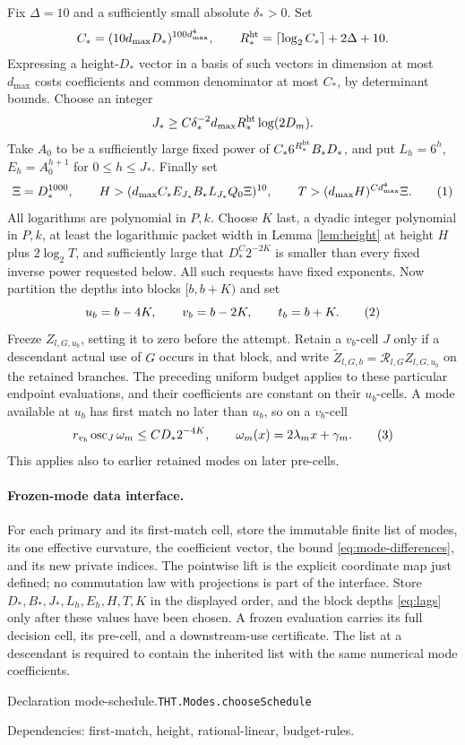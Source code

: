 \documentclass[11pt]{article}
\theoremstyle{definition}
\newcommand{\osc}{\operatorname{osc}}
\newcommand{\eqtag}[1]{\refstepcounter{equation}\tag{\theequation}\label{#1}}
\numberwithin{equation}{section}
\newcommand{\bp}[3]{\par\smallskip\begingroup\footnotesize
\noindent\hypertarget{bp:#1}{\textsf{Declaration #1.}}\quad\nolinkurl{#2}\par
\noindent\textsf{Dependencies:} #3.\par\endgroup\smallskip}
\begin{document}
Fix $\Delta=10$ and a sufficiently small absolute $\delta_*>0$. Set
\[
 C_*=(10d_{\max}D_*)^{100d_{\max}^4},\qquad
 R_*^{\rm ht}=\lceil\log_2C_*\rceil+2\Delta+10.
\]
Expressing a height-$D_*$ vector in a basis of such vectors in dimension at most $d_{\max}$ costs coefficients and common denominator at most $C_*$, by determinant bounds. Choose an integer
\[
 J_*\ge C\delta_*^{-2}d_{\max}R_*^{\rm ht}\log(2D_m).
\]
Take $A_0$ to be a sufficiently large fixed power of $C_*6^{R_*^{\rm ht}}B_*D_*$, and put $L_h=6^h$, $E_h=A_0^{h+1}$ for $0\le h\le J_*$. Finally set
\[
 \Xi=D_*^{1000},\qquad
 H>(d_{\max}C_*E_{J_*}B_*L_{J_*}Q_0\Xi)^{10},\qquad
 T>(d_{\max}H)^{Cd_{\max}^4}\Xi.
 \eqtag{eq:mode-parameters}
\]
All logarithms are polynomial in $P,k$. Choose $K$ last, a dyadic integer polynomial in $P,k$, at least the logarithmic packet width in Lemma \ref{lem:height} at height $H$ plus $2\log_2T$, and sufficiently large that $D_*^C2^{-2K}$ is smaller than every fixed inverse power requested below. All such requests have fixed exponents. Now partition the depths into blocks $[b,b+K)$ and set
\[
 u_b=b-4K,\qquad v_b=b-2K,\qquad t_b=b+K.
 \eqtag{eq:lags}
\]
Freeze $Z_{l,G,u_b}$, setting it to zero before the attempt. Retain a $v_b$-cell $J$ only if a descendant actual use of $G$ occurs in that block, and write $\widetilde Z_{l,G,b}=\mathcal R_{l,G}Z_{l,G,u_b}$ on the retained branches. The preceding uniform budget applies to these particular endpoint evaluations, and their coefficients are constant on their $u_b$-cells. A mode available at $u_b$ has first match no later than $u_b$, so on a $v_b$-cell
\[
 r_{v_b}\osc_J\omega_m\le CD_*2^{-4K},\qquad \omega_m(x)=2\lambda_mx+\gamma_m.
 \eqtag{eq:slope-variation}
\]
This applies also to earlier retained modes on later pre-cells.

\paragraph{Frozen-mode data interface.}
For each primary and its first-match cell, store the immutable finite list of modes, its one effective curvature, the coefficient vector, the bound \eqref{eq:mode-differences}, and its new private indices. The pointwise lift is the explicit coordinate map just defined; no commutation law with projections is part of the interface. Store $D_*,B_*,J_*,L_h,E_h,H,T,K$ in the displayed order, and the block depths \eqref{eq:lags} only after these values have been chosen. A frozen evaluation carries its full decision cell, its pre-cell, and a downstream-use certificate. The list at a descendant is required to contain the inherited list with the same numerical mode coefficients.
\bp{mode-schedule}{THT.Modes.chooseSchedule}{first-match, height, rational-linear, budget-rules}
\end{document}

